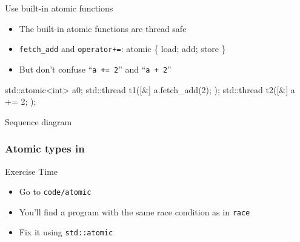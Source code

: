 \begin{frame}[fragile]
  \begin{block}{Use built-in atomic functions}
    \begin{itemize}
      \item The built-in atomic functions are thread safe
      \item \texttt{fetch_add} and \texttt{operator+=}: atomic \{ load; add; store \}
      \item But don't confuse ``\texttt{a += 2}'' and ``\texttt{a + 2}''
    \end{itemize}
  \end{block}
  \begin{exampleblock}{}
    \begin{cppcode*}{}
      std::atomic<int> a{0};
      std::thread t1([&]{ a.fetch_add(2); });
      std::thread t2([&]{ a += 2; });
    \end{cppcode*}
  \end{exampleblock}
  \begin{block}{Sequence diagram}
  \end{block}
\end{frame}

\begin{frame}[fragile]
  \frametitle{Atomic types in \cpp}
  \begin{alertblock}{Exercise Time}
    \begin{itemize}
      \item Go to \texttt{code/atomic}
      \item You'll find a program with the same race condition as in \texttt{race}
      \item Fix it using \texttt{std::atomic}
    \end{itemize}
  \end{alertblock}
\end{frame}
